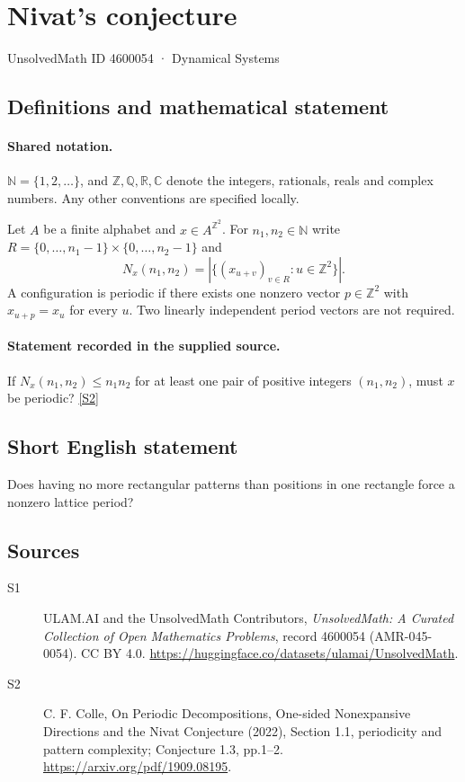\documentclass[11pt]{article}
\newcommand{\sref}[2]{\hyperlink{source:#1:#2}{[S#2]}}
\begin{document}
\setcounter{section}{4600053}
\section{Nivat's conjecture}\label{4600054}
{\small\sffamily UnsolvedMath ID 4600054 · Dynamical Systems}
\subsection{Definitions and mathematical statement}

\paragraph{Shared notation.}$\mathbb N=\{1,2,\ldots\}$, and $\mathbb Z,\mathbb Q,\mathbb R,\mathbb C$ denote the integers, rationals, reals and complex numbers. Any other conventions are specified locally.


Let $A$ be a finite alphabet and $x\in A^{\mathbb Z^2}$. For $n_1,n_2\in\mathbb N$ write $R=\{0,\ldots,n_1-1\}\times\{0,\ldots,n_2-1\}$ and \[N_x(n_1,n_2)=\left|\{(x_{u+v})_{v\in R}:u\in\mathbb Z^2\}\right|.\] A configuration is periodic if there exists one nonzero vector $p\in\mathbb Z^2$ with $x_{u+p}=x_u$ for every $u$. Two linearly independent period vectors are not required.
\paragraph{Statement recorded in the supplied source.}
If $N_x(n_1,n_2)\le n_1n_2$ for at least one pair of positive integers $(n_1,n_2)$, must $x$ be periodic? \sref{4600054}{2}
\subsection{Short English statement}
Does having no more rectangular patterns than positions in one rectangle force a nonzero lattice period?
\subsection{Sources}
\begin{description}
\item[\hypertarget{source:4600054:1}{S1}] ULAM.AI and the UnsolvedMath Contributors, \emph{UnsolvedMath: A Curated Collection of Open Mathematics Problems}, record 4600054 (AMR-045-0054). CC BY 4.0. \url{https://huggingface.co/datasets/ulamai/UnsolvedMath}.
\item[\hypertarget{source:4600054:2}{S2}] C. F. Colle, On Periodic Decompositions, One-sided Nonexpansive Directions and the Nivat Conjecture (2022), Section 1.1, periodicity and pattern complexity; Conjecture 1.3, pp.1--2. \url{https://arxiv.org/pdf/1909.08195}.
\end{description}
\label{end:4600054}
\end{document}
